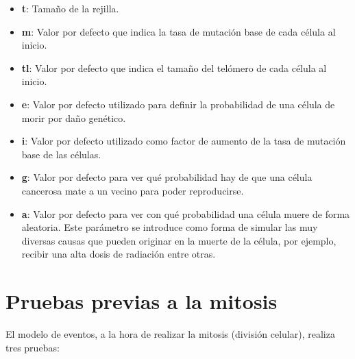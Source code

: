 \begin{itemize}
    \item \textbf{t}: Tamaño de la rejilla.
    \item \textbf{m}: Valor por defecto que indica la tasa de mutación base de cada célula al inicio.
    \item \textbf{tl}: Valor por defecto que indica el tamaño del telómero de cada célula al inicio.
    \item \textbf{e}: Valor por defecto utilizado para definir la probabilidad de una célula de morir por daño genético.
    \item \textbf{i}: Valor por defecto utilizado como factor de aumento de la tasa de mutación base de las células.
    \item \textbf{g}: Valor por defecto para ver qué probabilidad hay de que una célula cancerosa mate a un vecino para
    poder reproducirse.
    \item \textbf{a}: Valor por defecto para ver con qué probabilidad una célula muere de forma aleatoria. Este parámetro
    se introduce como forma de simular las muy diversas causas que pueden originar en la muerte de la célula, por ejemplo,
    recibir una alta dosis de radiación entre otras.
\end{itemize}

\section{Pruebas previas a la mitosis}

El modelo de eventos, a la hora de realizar la mitosis (división celular), realiza tres pruebas:

